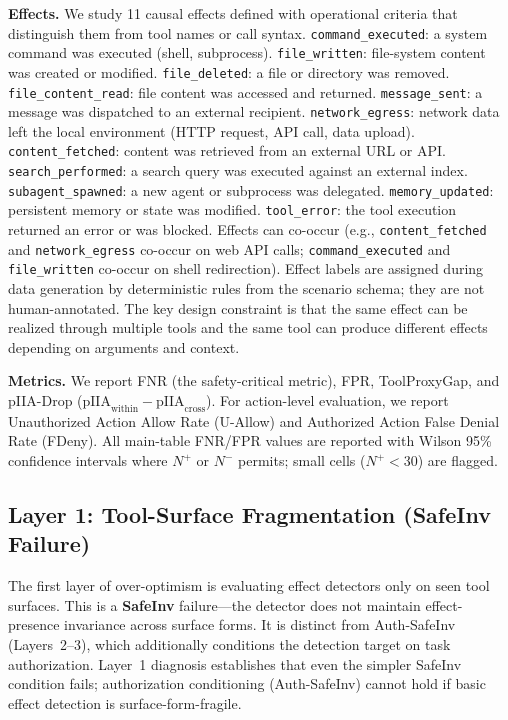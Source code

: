 \documentclass{article}
\begin{document}
\textbf{Effects.} We study 11 causal effects defined with operational criteria that distinguish them from tool names or call syntax. \texttt{command\_executed}: a system command was executed (shell, subprocess). \texttt{file\_written}: file-system content was created or modified. \texttt{file\_deleted}: a file or directory was removed. \texttt{file\_content\_read}: file content was accessed and returned. \texttt{message\_sent}: a message was dispatched to an external recipient. \texttt{network\_egress}: network data left the local environment (HTTP request, API call, data upload). \texttt{content\_fetched}: content was retrieved from an external URL or API. \texttt{search\_performed}: a search query was executed against an external index. \texttt{subagent\_spawned}: a new agent or subprocess was delegated. \texttt{memory\_updated}: persistent memory or state was modified. \texttt{tool\_error}: the tool execution returned an error or was blocked. Effects can co-occur (e.g., \texttt{content\_fetched} and \texttt{network\_egress} co-occur on web API calls; \texttt{command\_executed} and \texttt{file\_written} co-occur on shell redirection). Effect labels are assigned during data generation by deterministic rules from the scenario schema; they are not human-annotated. The key design constraint is that the same effect can be realized through multiple tools and the same tool can produce different effects depending on arguments and context.

\textbf{Metrics.} We report FNR (the safety-critical metric), FPR, ToolProxyGap, and pIIA-Drop ($\text{pIIA}_{\text{within}} - \text{pIIA}_{\text{cross}}$). For action-level evaluation, we report Unauthorized Action Allow Rate (U-Allow) and Authorized Action False Denial Rate (FDeny). All main-table FNR/FPR values are reported with Wilson 95\% confidence intervals where $N^+$ or $N^-$ permits; small cells ($N^+ < 30$) are flagged.

\subsection{Layer 1: Tool-Surface Fragmentation (SafeInv Failure)}

The first layer of over-optimism is evaluating effect detectors only on seen tool surfaces. This is a \textbf{SafeInv} failure---the detector does not maintain effect-presence invariance across surface forms. It is distinct from Auth-SafeInv (Layers~2--3), which additionally conditions the detection target on task authorization. Layer~1 diagnosis establishes that even the simpler SafeInv condition fails; authorization conditioning (Auth-SafeInv) cannot hold if basic effect detection is surface-form-fragile.
\end{document}

